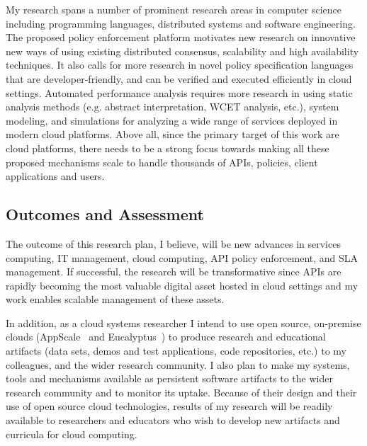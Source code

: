 My research spans a number of prominent research areas in computer
science including programming languages, 
distributed systems and software engineering. The proposed policy enforcement
platform motivates new research on innovative new ways of using existing
distributed consensus, scalability and high availability techniques. It also calls for
more research in novel policy specification languages that
are developer-friendly, and can be verified and executed efficiently in cloud settings.
Automated performance analysis requires more research in using
static analysis methods (e.g. abstract interpretation, WCET analysis, etc.), system modeling,
and simulations for analyzing a wide range of services deployed in modern cloud platforms.
Above all, since the primary target of this
work are cloud platforms, there needs to be a strong focus towards making all these 
proposed mechanisms scale to handle thousands of APIs, policies, client applications and users.

\subsection{Outcomes and Assessment}

The outcome of this research plan,
I believe, will be new advances in services computing, IT management, cloud
computing, API policy enforcement, and SLA management.
If successful, the research will be transformative since APIs are rapidly
becoming the most valuable digital asset hosted in cloud settings
and my work enables scalable management of these assets.

In addition,
as a cloud systems researcher I intend to use open source, on-premise clouds (AppScale~\cite{krintzappscale13}
and Eucalyptus~\cite{eucalyptus09}) to produce research and educational artifacts (data sets, demos and test applications, 
code repositories, etc.) to my colleagues, 
and the wider research community.  
I also plan to make my systems, tools and mechanisms available as persistent software artifacts to
the wider research community and to monitor its uptake.  Because of their design
and their use of open source cloud technologies, results of my research will be readily available
to researchers and educators who wish to develop new artifacts and curricula
for cloud computing. 
